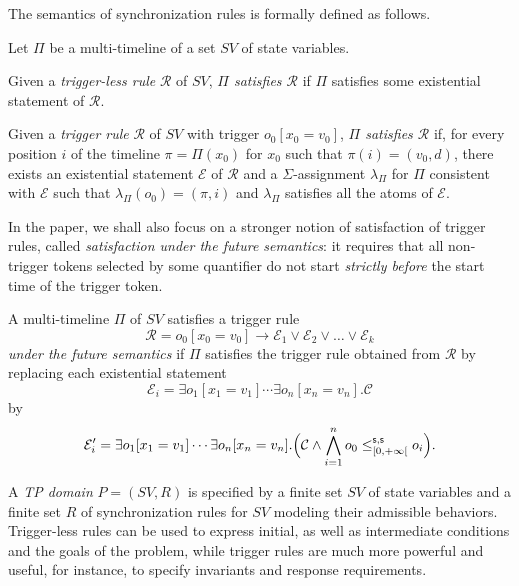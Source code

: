  The semantics of synchronization rules is formally defined as follows.
\begin{definition}\label{def:semanticsRules}
Let $\Pi$ be a multi-timeline of a set $SV$ of state variables.

Given a \emph{trigger-less rule} $\mathcal{R}$ of $SV$, \emph{$\Pi$ satisfies $\mathcal{R}$} if $\Pi$ satisfies some existential statement of $\mathcal{R}$.

Given a \emph{trigger rule} $\mathcal{R}$ of $SV$ with trigger $o_0[x_0=v_0]$, \emph{$\Pi$ satisfies   $\mathcal{R}$} if, for every position $i$ of the
 timeline $\pi=\Pi(x_0)$ for $x_0$ such that $\pi(i)=(v_0,d)$, there exists an existential statement $\mathcal{E}$ of $\mathcal{R}$  and a $\Sigma$-assignment
 $\lambda_\Pi$ for $\Pi$ consistent with $\mathcal{E}$ such that $\lambda_\Pi(o_0)= (\pi,i)$ and $\lambda_\Pi$ satisfies all the atoms of $\mathcal{E}$.
\end{definition}

In the paper, we shall also focus on a stronger notion of satisfaction of trigger rules, called \emph{satisfaction under the future semantics}: it requires that all non-trigger tokens selected by some quantifier
do not start \emph{strictly before} the start time of the trigger token.

\begin{definition}\label{def:futurerules}
  A multi-timeline $\Pi$ of $SV$ satisfies a trigger rule \[\mathcal{R}= o_0[x_0=v_0] \to \mathcal{E}_1\vee \mathcal{E}_2\vee
  \ldots \vee \mathcal{E}_k\]   \emph{under the future semantics} if $\Pi$ satisfies the trigger rule obtained from
  $\mathcal{R}$ by replacing each existential statement \[\mathcal{E}_i=\exists o_1[x_1=v_1]\cdots \exists o_n[x_n=v_n].\mathcal{C}\]
  by \[\mathcal{E}_i'=\exists o_1[x_1=v_1]\cdots \exists o_n[x_n=v_n].\Big(\mathcal{C}\wedge  \bigwedge_{i=1}^{n} o_0\leq^{\mathsf{s},\mathsf{s}}_{[0,+\infty[} o_i\Big).\]
\end{definition}

A \emph{TP domain} $P=(SV,R)$ is specified by a finite set $SV$ of state variables and
a finite set $R$ of synchronization rules for $SV$ modeling their admissible behaviors.
Trigger-less rules can be used to express initial, as well as intermediate conditions
and the goals of the problem, while trigger rules are much more powerful and useful, for instance, to specify invariants and response requirements. 

